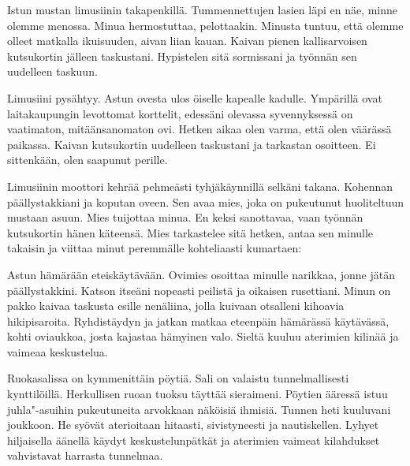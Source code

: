 \ifpdf{}\fi


\subchapter{}\noindent{}Istun mustan limusiinin takapenkill\"{a}. Tummennettujen lasien l\"{a}pi en n\"{a}e, minne olemme menossa. Minua hermostuttaa, pelottaakin. Minusta tuntuu, ett\"{a} olemme olleet matkalla ikuisuuden, aivan liian kauan. Kaivan pienen kallisarvoisen kutsukortin j\"{a}lleen taskustani. Hypistelen sit\"{a} sormissani ja ty\"{o}nn\"{a}n sen uudelleen taskuun.

\indent{}Limusiini pys\"{a}htyy. Astun ovesta ulos \"{o}iselle kapealle kadulle. Ymp\"{a}rill\"{a} ovat laitakaupungin levottomat korttelit, edess\"{a}ni olevassa syvennyksess\"{a} on vaatimaton, mit\"{a}\"{a}nsanomaton ovi. Hetken aikaa olen varma, ett\"{a} olen v\"{a}\"{a}r\"{a}ss\"{a} paikassa. Kaivan kutsukortin uudelleen taskustani ja tarkastan osoitteen. Ei sittenk\"{a}\"{a}n, olen saapunut perille.

\indent{}Limusiinin moottori kehr\"{a}\"{a} pehme\"{a}sti tyhj\"{a}k\"{a}ynnill\"{a} selk\"{a}ni takana. Kohennan p\"{a}\"{a}llystakkiani ja koputan oveen. Sen avaa mies, joka on pukeutunut huoliteltuun mustaan asuun. Mies tuijottaa minua. En keksi sanottavaa, vaan ty\"{o}nn\"{a}n kutsukortin h\"{a}nen k\"{a}teens\"{a}. Mies tarkastelee sit\"{a} hetken, antaa sen minulle takaisin ja viittaa minut peremm\"{a}lle kohteliaasti kumartaen: 

\indent{}Astun h\"{a}m\"{a}r\"{a}\"{a}n eteisk\"{a}yt\"{a}v\"{a}\"{a}n. Ovimies osoittaa minulle narikkaa, jonne j\"{a}t\"{a}n p\"{a}\"{a}llystakkini. Katson itse\"{a}ni nopeasti peilist\"{a} ja oikaisen rusettiani. Minun on pakko kaivaa taskusta esille nen\"{a}liina, jolla kuivaan otsalleni kihoavia hikipisaroita. Ryhdist\"{a}ydyn ja jatkan matkaa eteenp\"{a}in h\"{a}m\"{a}r\"{a}ss\"{a} k\"{a}yt\"{a}v\"{a}ss\"{a}, kohti oviaukkoa, josta kajastaa h\"{a}myinen valo. Sielt\"{a} kuuluu aterimien kilin\"{a}\"{a} ja vaimeaa keskustelua.

\indent{}Ruokasalissa on kymmenitt\"{a}in p\"{o}yti\"{a}. Sali on valaistu tunnelmallisesti kynttil\"{o}ill\"{a}. Herkullisen ruoan tuoksu t\"{a}ytt\"{a}\"{a} sieraimeni. P\"{o}ytien \"{a}\"{a}ress\"{a} istuu juhla"-asuihin pukeutuneita arvokkaan n\"{a}k\"{o}isi\"{a} ihmisi\"{a}. Tunnen heti kuuluvani joukkoon. He sy\"{o}v\"{a}t aterioitaan hitaasti, sivistyneesti ja nautiskellen. Lyhyet hiljaisella \"{a}\"{a}nell\"{a} k\"{a}ydyt keskustelunp\"{a}tk\"{a}t ja aterimien vaimeat kilahdukset vahvistavat harrasta tunnelmaa.

